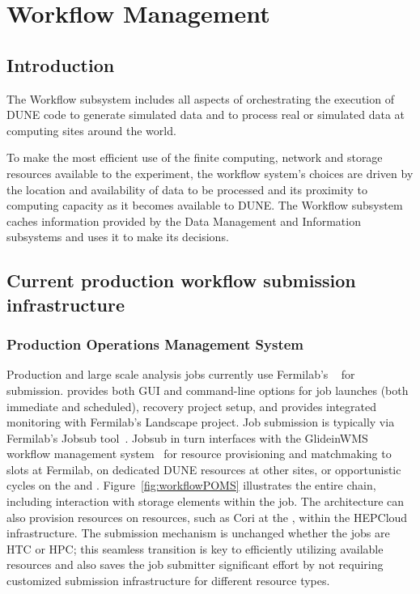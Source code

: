 \documentclass[../main-v1.tex]{subfiles}
\begin{document}
\chapter{Workflow Management }
\label{ch:wkflow}

\section{Introduction }
\label{sec:flow:intro} 

The Workflow subsystem includes all aspects of orchestrating the execution of DUNE code to generate simulated data and to process real or simulated data at computing sites around the world. 

To make the most efficient use of the finite computing, network and storage resources available to the experiment, the workflow system's choices are driven by the location and availability of data to be processed and its proximity to computing capacity as it becomes available to DUNE. The Workflow subsystem caches information provided by the Data Management and Information subsystems and uses it to make its decisions.


\section{Current production workflow submission infrastructure }
\label{sec:current}

\subsection{Production Operations Management System}
\label{subsec:jobsub}

Production and large scale analysis jobs currently use Fermilab's ~\cite{Mengel:2020wev} for submission.  provides both GUI and command-line options for job launches (both immediate and scheduled), recovery project setup, and provides integrated monitoring with Fermilab's Landscape project. Job submission is typically via Fermilab's Jobsub tool~\cite{box2014fife}. Jobsub in
turn interfaces with the GlideinWMS workflow management system~\cite{sfiligoi2009pilot} for resource provisioning and matchmaking to slots at Fermilab, on dedicated DUNE resources at other sites, or opportunistic cycles on the    and . Figure~\ref{fig:workflowPOMS} illustrates the entire chain, including interaction with storage elements within the job.
The architecture can also provision resources on  resources, such as Cori at the , within the HEPCloud~\cite{mhashilkar2019hepcloud} infrastructure. The submission mechanism is unchanged whether the jobs are HTC or HPC; this seamless transition is key to efficiently utilizing available resources and also saves the job submitter significant effort by not requiring customized submission infrastructure for different resource types.
\end{document}
